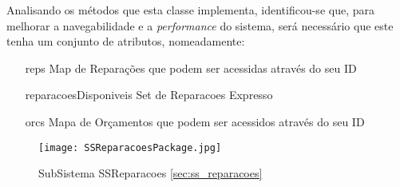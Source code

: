 \documentclass[../../relatorio.tex]{subfiles}
\begin{document}
Analisando os métodos que esta classe implementa, identificou-se que, para melhorar a navegabilidade
e a \textit{performance} do sistema, será necessário que este tenha um conjunto de atributos, nomeadamente:
\begin{itemize}
    \item [reps]{Map de Reparações que podem ser acessidas através do seu ID}
    \item [reparacoesDisponiveis]{Set de Reparacoes Expresso}
    \item [orcs]{Mapa de Orçamentos que podem ser acessidos através do seu ID}
\end{itemize}



\begin{figure}[!ht]
    \centering
    \texttt{[image: SSReparacoesPackage.jpg]}
    \caption{SubSistema SSReparacoes \ref{sec:ss_reparacoes}}
\end{figure}
\end{document}
